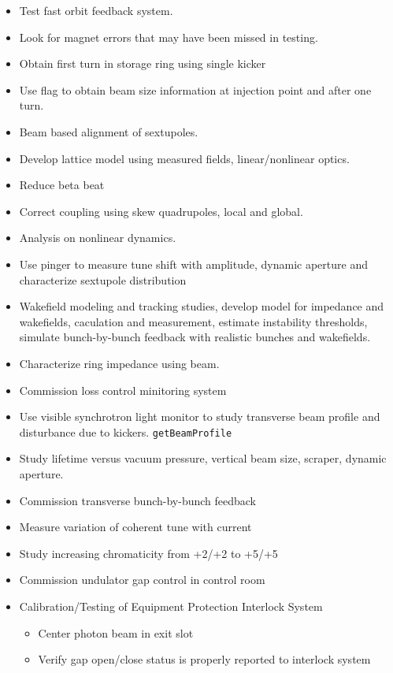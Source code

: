 \documentclass[11pt,oneside,letterpaper,showtrims,article]{memoir}
\newcommand{\code}[1]{\texttt{#1}}
\begin{document}
\begin{itemize}%
\item Test fast orbit feedback system.
\item Look for magnet errors that may have been missed in testing.
\item Obtain first turn in storage ring using single kicker
\item Use flag to obtain beam size information at injection point and
  after one turn.
\item Beam based alignment of sextupoles.
\item Develop lattice model using measured fields, linear/nonlinear optics.
\item Reduce beta beat
\item Correct coupling using skew quadrupoles, local and global.
\item Analysis on nonlinear dynamics.
\item Use pinger to measure tune shift with amplitude, dynamic aperture
  and characterize sextupole distribution
\item Wakefield modeling and tracking studies, develop model for
  impedance and wakefields, caculation and measurement, estimate
  instability thresholds, simulate bunch-by-bunch feedback with
  realistic bunches and wakefields.
\item Characterize ring impedance using beam.
\item Commission loss control minitoring system
\item Use visible synchrotron light monitor to study transverse beam
  profile and disturbance due to kickers. \code{getBeamProfile}
\item Study lifetime versus vacuum pressure, vertical beam size, scraper, dynamic aperture.
\item Commission transverse bunch-by-bunch feedback
\item Measure variation of coherent tune with current
\item Study increasing chromaticity from +2/+2 to +5/+5
\item Commission undulator gap control in control room
\item Calibration/Testing of Equipment Protection Interlock System
  \begin{itemize}%
  \item Center photon beam in exit slot
  \item Verify gap open/close status is properly reported to interlock system

\end{itemize}
\end{itemize}
\end{document}
